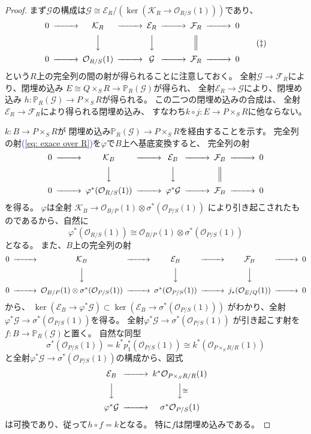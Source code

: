 \documentclass[uplatex]{jsarticle}
\renewcommand{\eqref}[1]{\textcolor{blue}{(\ref{#1})}}
\theoremstyle{definition}
\renewcommand{\P}{\mathbb{P}}
\newcommand{\mcE}{\mathcal{E}}
\newcommand{\mcF}{\mathcal{F}}
\newcommand{\mcG}{\mathcal{G}}
\newcommand{\mcK}{\mathcal{K}}
\newcommand{\mcO}{\mathcal{O}}
\newcommand{\OOO}{\mcO}
\newcommand{\OO}[1]{\OOO_{#1}}
\begin{document}
\begin{proof}
  まず\(\mcG\)の構成は\(\mcG\cong \mcE_R/(\ker (\mcK_R\to \OO{R/S}(1)))\)であり、
  \begin{equation}\label{eq: exace over R}
    \begin{CD}
      0 @>>> \mcK_R @>>> \mcE_R @>>> \mcF_R @>>> 0 \\
      @. @VVV @VVV @| @.\\
      0 @>>> \OO{R/S}(1) @>>> \mcG @>>> \mcF_R @>>> 0
    \end{CD}
    \tag{\(\ddagger\)}
  \end{equation}
  という\(R\)上の完全列の間の射が得られることに注意しておく。
  全射\(\mcG\to \mcF_R\)により、閉埋め込み
  \(E\cong Q\times_SR\to \P_R(\mcG)\)が得られ、
  全射\(\mcE_R\to \mcG\)により、閉埋め込み
  \(h:\P_R(\mcG)\to P\times_SR\)が得られる。
  この二つの閉埋め込みの合成は、
  全射\(\mcE_R\to \mcF_R\)により得られる閉埋め込み、
  すなわち\(k\circ j:E\to P\times_SR\)に他ならない。

  \(k:B\to P\times_SR\)が
  閉埋め込み\(\P_R(\mcG)\to P\times_SR\)を経由することを示す。
  完全列の射\eqref{eq: exace over R}を\(\varphi\)で\(B\)上へ基底変換すると、
  完全列の射
  \[
  \begin{CD}
    0 @>>> \mcK_B @>>> \mcE_B @>>> \mcF_B @>>> 0 \\
    @. @VVV @VVV @| @. \\
    0 @>>> \varphi^*(\OO{R/S}(1)) @>>> \varphi^*\mcG @>>> \mcF_B @>>> 0
  \end{CD}
  \]
  を得る。
  \(\varphi\)は全射
  \(\mcK_B\to \OO{B/P}(1)\otimes \sigma^*(\OO{P/S}(1))\)
  により引き起こされたものであるから、自然に
  \[
  \varphi^*(\OO{R/S}(1))\cong \OO{B/P}(1)\otimes \sigma^*(\OO{P/S}(1))
  \]
  となる。
  また、\(B\)上の完全列の射
  \[
  \begin{CD}
    0 @>>> \mcK_B @>>> \mcE_B @>>> \mcF_B @>>> 0 \\
    @. @VVV @VVV @VVV @.\\
    0 @>>> \OO{B/P}(1)\otimes \sigma^*(\OO{P/S}(1)) @>>>
    \sigma^*(\OO{P/S}(1)) @>>> j_*(\OO{E/Q}(1)) @>>> 0
  \end{CD}
  \]
  から、
  \(\ker(\mcE_B\to \varphi^*\mcG)\subset
  \ker(\mcE_B\to \sigma^*(\OO{P/S}(1)))\)
  がわかり、全射\(\varphi^*\mcG\to \sigma^*(\OO{P/S}(1))\)を得る。
  全射\(\varphi^*\mcG\to \sigma^*(\OO{P/S}(1))\)
  が引き起こす射を\(f:B\to \P_R(\mcG)\)と置く。
  自然な同型
  \[
  \sigma^*(\OO{P/S}(1)) = k^*p_1^*(\OO{P/S}(1))\cong k^*(\OO{P\times_SR/R}(1))
  \]
  と全射\(\varphi^*\mcG\to \sigma^*(\OO{P/S}(1))\)の構成から、図式
  \[
  \begin{CD}
    \mcE_B @>>> k^*\OO{P\times_SR/R}(1) \\
    @VVV @VV\cong V \\
    \varphi^*\mcG @>>> \sigma^*\OO{P/S}(1)
  \end{CD}
  \]
  は可換であり、従って\(h\circ f = k\)となる。
  特に\(f\)は閉埋め込みである。


\end{proof}
\end{document}
